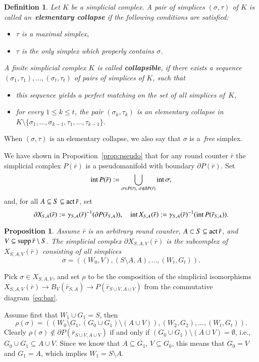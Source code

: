\documentclass{amsart}[10pt]
\newtheorem{df}[theorem]{Definition}
\newtheorem{prop}[theorem]{Proposition}
\newcommand{\pr}{\nin{\bf Proof.} }
\newcommand{\act}{\text{\rm act}\,}
\newcommand{\es}{\emptyset}
\newcommand{\inte}{\text{\rm int}\,}
\newcommand{\ra}{\rightarrow}
\newcommand{\sm}{\setminus}
\newcommand{\supp}{\text{\rm supp}\,}
\newcommand{\tr}{{\bar r}}
\numberwithin{equation}{section}
\numberwithin{figure}{section}
\numberwithin{table}{section}
\begin{document}
\begin{df}
Let $K$ be a simplicial complex. A pair of simplices $(\sigma,\tau)$
of $K$ is called an~{\bf elementary collapse} if the following
conditions are satisfied:
\begin{itemize}
\item $\tau$ is a maximal simplex,
\item $\tau$ is the only simplex which properly contains $\sigma$.
\end{itemize}
A finite simplicial complex $K$ is called {\bf collapsible}, if there
exists a sequence $(\sigma_1,\tau_1),\dots,\allowbreak
(\sigma_t,\tau_t)$ of pairs of simplices of $K$, such that
\begin{itemize}
\item this sequence yields a perfect matching on the set of all simplices of~$K$,
\item for every $1\leq k\leq t$, the pair $(\sigma_k,\tau_k)$ is an
  elementary collapse in
  $K\sm\{\sigma_1,\dots,\sigma_{k-1},\allowbreak\tau_1,\dots,\tau_{k-1}\}$.
\end{itemize}
\end{df}

When $(\sigma,\tau)$ is an elementary collapse, we also say that $\sigma$
is a~{\it free} simplex.

We have shown in Proposition~\ref{prop:pseudo} that for any round counter $\tr$ 
the simplicial complex $P(\tr)$ is a pseudomanifold with boundary $\partial P(\tr)$.
Set 
\[\inte P(\tr):=\bigcup_{\sigma\in P(\tr),\,\,\sigma\notin\partial P(\tr)}\inte\sigma,\]
and, for all $A\subseteq S\subseteq\act\tr$, set
\[\partial X_{S,A}(\tr):=\gamma_{S,A}(\tr)^{-1}(\partial P(\tr_{S,A})),\quad
\inte X_{S,A}(\tr):=\gamma_{S,A}(\tr)^{-1}(\inte P(\tr_{S,A})).\]

\begin{prop}\label{prop:6.9}
Assume $\tr$ is an arbitrary round counter, $A\subset S
\subseteq\act\tr$, and $V\subseteq\supp\tr\sm S$. The simplicial
complex $\partial X_{S,A,V}(\tr)$ is the subcomplex of
$X_{S,A,V}(\tr)$ consisting of all simplices
\[\sigma=((W_0,V),\allowbreak (S\sm A,A),\dots,(W_t,G_t)).\]
\end{prop}
\pr Pick $\sigma\in X_{S,A,V}$, and set $\rho$ to be the composition
of the simplicial isomorphisms $X_{S,A,V}(\tr)\ra B_V(\tr_{S,A})\ra
P(\tr_{S\cup V, A\cup V})$ from the commutative
diagram~\eqref{eq:bar}. 

Assume first that $W_1\cup G_1=S$, then
\[\rho(\sigma)=((W_0\sm G_1,(G_0\cup G_1)\sm(A\cup V)),(W_2,G_2),
\dots,(W_t,G_t)).\]
Clearly $\rho(\sigma)\notin\partial P(\tr_{S\cup V,A\cup V})$ if and
only if $(G_0\cup G_1)\sm(A\cup V)=\es$, i.e., $G_0\cup G_1\subseteq
A\cup V$. Since we know that $A\subseteq G_1$, $V\subseteq G_0$, this
means that $G_0=V$ and $G_1=A$, which implies $W_1=S\sm A$. 
\end{document}
